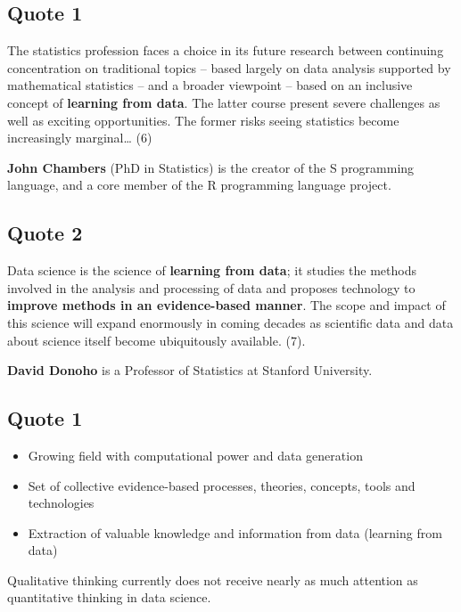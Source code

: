 \documentclass[
  letterpaper,
  DIV=11,
  numbers=noendperiod,
  oneside]{scrreprt}
\providecommand{\tightlist}{%
  \setlength{\itemsep}{0pt}\setlength{\parskip}{0pt}}\usepackage{longtable,booktabs,array}
\begin{document}
\subsection{\texorpdfstring{Quote 1 {💬}}{Quote 1 💬}}

The statistics profession faces a choice in its future research between
continuing concentration on traditional topics -- based largely on data
analysis supported by mathematical statistics -- and a broader viewpoint
-- based on an inclusive concept of \textbf{learning from data}. The
latter course present severe challenges as well as exciting
opportunities. The former risks seeing statistics become increasingly
marginal\ldots{} (6)

\textbf{John Chambers} (PhD in Statistics) is the creator of the S
programming language, and a core member of the R programming language
project.

\subsection{\texorpdfstring{Quote 2 {💬}}{Quote 2 💬}}

Data science is the science of \textbf{learning from data}; it studies
the methods involved in the analysis and processing of data and proposes
technology to \textbf{improve methods in an evidence-based manner}. The
scope and impact of this science will expand enormously in coming
decades as scientific data and data about science itself become
ubiquitously available. (7).

\textbf{David Donoho} is a Professor of Statistics at Stanford
University.

\subsection{Quote 1}

\begin{itemize}
\tightlist
\item
  Growing field with computational power and data generation
\item
  Set of collective evidence-based processes, theories, concepts, tools
  and technologies
\item
  Extraction of valuable knowledge and information from data (learning
  from data)
\end{itemize}

Qualitative thinking currently does not receive nearly as much attention
as quantitative thinking in data science.
\end{document}
